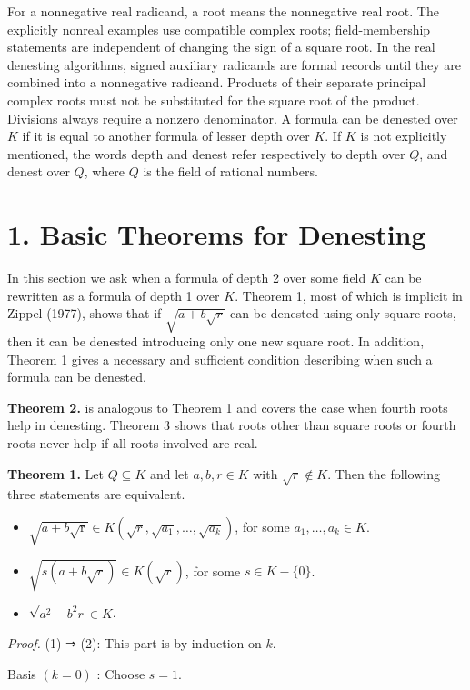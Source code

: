 \documentclass[11pt,letterpaper]{article}
\begin{document}
For a nonnegative real radicand, a root means the nonnegative real root. The explicitly nonreal examples use compatible complex roots; field-membership statements are independent of changing the sign of a square root. In the real denesting algorithms, signed auxiliary radicands are formal records until they are combined into a nonnegative radicand. Products of their separate principal complex roots must not be substituted for the square root of the product. Divisions always require a nonzero denominator. A formula can be denested over $K$ if it is equal to another formula of lesser depth over $K$. If $K$ is not explicitly mentioned, the words depth and denest refer respectively to depth over $Q$, and denest over $Q$, where $Q$ is the field of rational numbers.

\section*{1. Basic Theorems for Denesting}
In this section we ask when a formula of depth 2 over some field $K$ can be rewritten as a formula of depth 1 over $K$. Theorem 1, most of which is implicit in Zippel (1977), shows that if $\sqrt{a+b \sqrt{r}}$ can be denested using only square roots, then it can be denested introducing only one new square root. In addition, Theorem 1 gives a necessary and sufficient condition describing when such a formula can be denested.

\noindent\textbf{Theorem 2.} is analogous to Theorem 1 and covers the case when fourth roots help in denesting. Theorem 3 shows that roots other than square roots or fourth roots never help if all roots involved are real.

\noindent\textbf{Theorem 1.} Let $Q \subseteq K$ and let $a, b, r \in K$ with $\sqrt{r} \notin K$. Then the following three statements are equivalent.

\begin{itemize}
  \item[(1)] $\sqrt{a+b \sqrt{\mathrm{r}}} \in K\left(\sqrt{r}, \sqrt{a_{1}}, \ldots, \sqrt{a_{k}}\right)$, for some $a_{1}, \ldots, a_{k} \in K$.
  \item[(2)] $\sqrt{s(a+b \sqrt{r})} \in K(\sqrt{r})$, for some $s \in K-\{0\}$.
  \item[(3)] $\sqrt{a^{2}-b^{2} r} \in K$.
\end{itemize}

\noindent\textit{Proof.} (1) ⇒ (2): This part is by induction on $k$.

Basis $(k=0)$ : Choose $s=1$.
\end{document}
